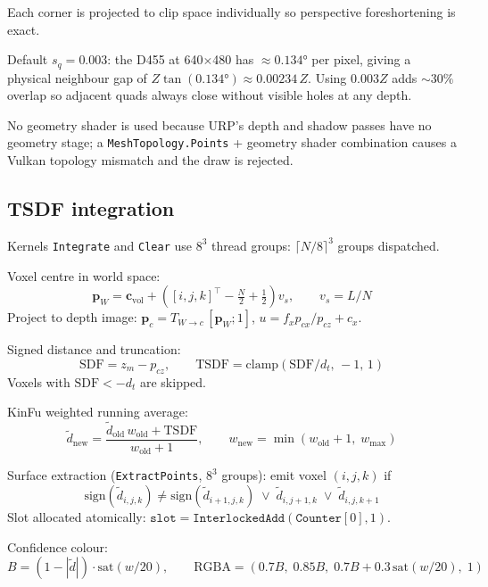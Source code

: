 \documentclass[11pt,a4paper]{article}
\begin{document}
Each corner is projected to clip space individually so perspective foreshortening is exact.

Default $s_q = 0.003$: the D455 at 640$\times$480 has $\approx 0.134°$ per pixel, giving a
physical neighbour gap of $Z\tan(0.134°) \approx 0.00234\,Z$. Using $0.003Z$ adds
$\mathord{\sim}30\%$ overlap so adjacent quads always close without visible holes at any depth.

No geometry shader is used because URP's depth and shadow passes have no geometry stage;
a \texttt{MeshTopology.Points} + geometry shader combination causes a Vulkan topology
mismatch and the draw is rejected.

\subsection{TSDF integration}

Kernels \texttt{Integrate} and \texttt{Clear} use $8^3$ thread groups:
$\lceil N/8\rceil^3$ groups dispatched.

Voxel centre in world space:
\[
\mathbf{p}_W = \mathbf{c}_\text{vol} + \left([i,j,k]^\top - \tfrac{N}{2} + \tfrac{1}{2}\right)v_s, \qquad v_s = L/N
\]
Project to depth image: $\mathbf{p}_c = T_{W\to c}\,[\mathbf{p}_W;1]$,\; $u = f_x p_{cx}/p_{cz}+c_x$.

Signed distance and truncation:
\[
\text{SDF} = z_m - p_{cz}, \qquad
\text{TSDF} = \text{clamp}(\text{SDF}/d_t,\,-1,\,1)
\]
Voxels with $\text{SDF} < -d_t$ are skipped.

KinFu weighted running average:
\[
\tilde{d}_\text{new} = \frac{\tilde{d}_\text{old}\,w_\text{old} + \text{TSDF}}{w_\text{old}+1}, \qquad
w_\text{new} = \min(w_\text{old}+1,\;w_{\max})
\]

Surface extraction (\texttt{ExtractPoints}, $8^3$ groups): emit voxel $(i,j,k)$ if
\[
\text{sign}(\tilde{d}_{i,j,k}) \neq \text{sign}(\tilde{d}_{i+1,j,k})
\;\lor\; \tilde{d}_{i,j+1,k}
\;\lor\; \tilde{d}_{i,j,k+1}
\]
Slot allocated atomically: $\texttt{slot} = \texttt{InterlockedAdd}(\texttt{Counter}[0], 1)$.

Confidence colour:
\[
B = (1-|\tilde{d}|)\cdot\text{sat}(w/20), \qquad
\text{RGBA} = (0.7B,\;0.85B,\;0.7B+0.3\,\text{sat}(w/20),\;1)
\]
\end{document}
